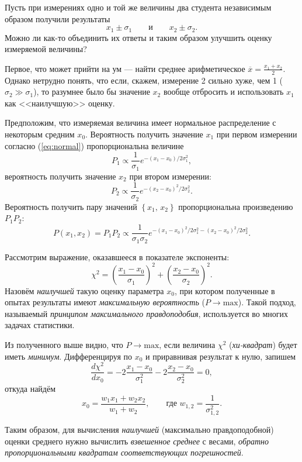 \documentclass[10pt]{article}
\begin{document}
Пусть при измерениях одно и той же величины два студента
независимым образом получили результаты 
\[
x_{1}\pm\sigma_{1}\qquad\text{и}\qquad x_{2}\pm\sigma_{2}.
\]
Можно ли как-то объединить их ответы и таким образом улучшить оценку
измеряемой величины?

Первое, что может прийти на ум --- найти среднее
арифметическое $\overline{x}=\frac{x_{1}+x_{2}}{2}.$ Однако нетрудно
понять, что если, скажем, измерение 2 сильно хуже, чем 1 ($\sigma_{2}\gg\sigma_{1}$),
то разумнее было бы значение $x_{2}$ вообще отбросить и использовать
$x_{1}$ как <<наилучшую>> оценку.

Предположим, что измеряемая величина имеет нормальное распределение
с некоторым средним $x_{0}$. Вероятность получить значение $x_{1}$
при первом измерении согласно (\ref{eq:normal}) пропорциональна величине
\[
P_{1}\propto\frac{1}{\sigma_{1}}e^{-\left(x_{1}-x_{0}\right)/2\sigma_{1}^{2}},
\]
вероятность получить значение $x_{2}$ при втором измерении:
\[
P_{2}\propto\frac{1}{\sigma_{2}}e^{-\left(x_{2}-x_{0}\right)^{2}/2\sigma_{2}^{2}}.
\]
Вероятность получить пару значений $\left\{ x_{1},\,x_{2}\right\} $
пропорциональна произведению $P_{1}P_{2}$:
\[
P\left(x_{1},x_{2}\right)=P_{1}P_{2}\propto\frac{1}{\sigma_{1}\sigma_{2}}e^{-\left(x_{1}-x_{0}\right)^{2}/2\sigma_{1}^{2}-\left(x_{2}-x_{0}\right)^{2}/2\sigma_{2}^{2}}.
\]

Рассмотрим выражение, оказавшееся в показателе экспоненты:
\[
\chi^{2}=\left(\frac{x_{1}-x_{0}}{\sigma_{1}}\right)^{2}+\left(\frac{x_{2}-x_{0}}{\sigma_{2}}\right)^{2}.
\]
Назовём \emph{наилучшей} такую оценку параметра
$x_{0}$, при котором полученные в опытах результаты имеют \emph{максимальную
вероятность} ($P\to\mathrm{max}$). Такой подход, называемый
\emph{принципом максимального правдоподобия}, используется
во многих задачах статистики.

Из полученного выше видно, что $P\to\mathrm{max}$, если
величина $\chi^{2}$ (\emph{хи-квадрат}) будет иметь
\emph{минимум}. Дифференцируя по $x_{0}$ и приравнивая
результат к нулю, запишем 
\[
\frac{d\chi^{2}}{dx_{0}}=-2\frac{x_{1}-x_{0}}{\sigma_{1}^{2}}-2\frac{x_{2}-x_{0}}{\sigma_{2}^{2}}=0,
\]
откуда найдём
\begin{equation}
x_{0}=\frac{w_{1}x_{1}+w_{2}x_{2}}{w_{1}+w_{2}},\qquad\text{где }w_{1,2}=\frac{1}{\sigma_{1,2}^{2}}.
\end{equation}

Таким образом, для вычисления \emph{наилучшей} (максимально правдоподобной) оценки
среднего нужно вычислить \emph{взвешенное среднее} с весами, \emph{обратно
пропорциональными квадратам соответствующих погрешностей}.
\end{document}
